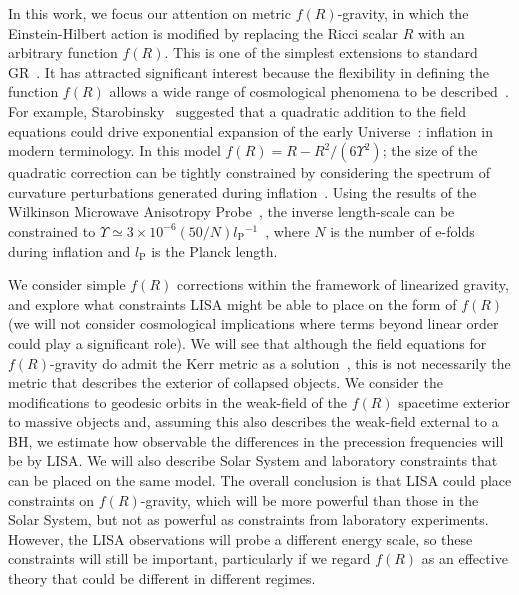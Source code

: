 \documentclass[aps,prd,amsfonts,amssymb,amsmath,nofootinbib,reprint,showpacs]{revtex4-1}
\newcommand{\sub}[1]{\ensuremath{_\text{#1}}}
\begin{document}
In this work, we focus our attention on metric $f(R)$-gravity, in which the Einstein-Hilbert action is modified by replacing the Ricci scalar $R$ with an arbitrary function $f(R)$. This is one of the simplest extensions to standard GR~\cite{Sotiriou2010, DeFelice2010}. It has attracted significant interest because the flexibility in defining the function $f(R)$ allows a wide range of cosmological phenomena to be described~\cite{Nojiri2007, Capozziello2007a}. For example, Starobinsky~\cite{Starobinsky1980} suggested that a quadratic addition to the field equations could drive exponential expansion of the early Universe~\cite{Vilenkin1985}: inflation in modern terminology. In this model $f(R) = R - R^2/(6\Upsilon^2)$; the size of the quadratic correction can be tightly constrained by considering the spectrum of curvature perturbations generated during inflation~\cite{Starobinskii1983, Starobinskii1985}. Using the results of the Wilkinson Microwave Anisotropy Probe~\cite{Jarosik2011, Larson2011}, the inverse length-scale can be constrained to $\Upsilon \simeq 3 \times 10^{-6} (50/N) l\sub{P}^{-1}$~\cite{Starobinsky2007, DeFelice2010}, where $N$ is the number of e-folds during inflation and $l\sub{P}$ is the Planck length. 

We consider simple $f(R)$ corrections within the framework of linearized gravity, and explore what constraints LISA might be able to place on the form of $f(R)$ (we will not consider cosmological implications where terms beyond linear order could play a significant role). We will see that although the field equations for $f(R)$-gravity do admit the Kerr metric as a solution~\cite{Psaltis2008, Barausse2008}, this is not necessarily the metric that describes the exterior of collapsed objects. We consider the modifications to geodesic orbits in the weak-field of the $f(R)$ spacetime exterior to massive objects and, assuming this also describes the weak-field external to a BH, we estimate how observable the differences in the precession frequencies will be by LISA. We will also describe Solar System and laboratory constraints that can be placed on the same model. The overall conclusion is that LISA could place constraints on $f(R)$-gravity, which will be more powerful than those in the Solar System, but not as powerful as constraints from laboratory experiments. However, the LISA observations will probe a different energy scale, so these constraints will still be important, particularly if we regard $f(R)$ as an effective theory that could be different in different regimes. 
\end{document}

